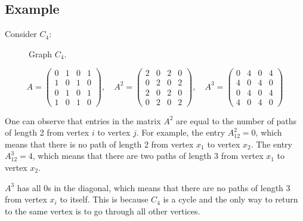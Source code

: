\documentclass[11pt]{article}
\begin{document}
\subsection*{Example}
Consider $C_4$:
\begin{figure}[H]
    \centering
    \hspace{1cm}
    \caption{Graph $C_4$.}
    \label{fig:C4}
\end{figure}
\[
A = \begin{pmatrix}
    0 & 1 & 0 & 1 \\
    1 & 0 & 1 & 0 \\
    0 & 1 & 0 & 1 \\
    1 & 0 & 1 & 0
\end{pmatrix}, \quad
A^2 = \begin{pmatrix}
    2 & 0 & 2 & 0 \\
    0 & 2 & 0 & 2 \\
    2 & 0 & 2 & 0 \\
    0 & 2 & 0 & 2
\end{pmatrix}, \quad A^3 = \begin{pmatrix}
    0 & 4 & 0 & 4 \\
    4 & 0 & 4 & 0 \\
    0 & 4 & 0 & 4 \\
    4 & 0 & 4 & 0
\end{pmatrix}
\]

One can observe that entries in the matrix $A^2$ are equal to the number of paths of length 2 from vertex $i$ to vertex $j$. For example, the entry $A^2_{12} = 0$, which means that there is no path of length 2 from vertex $x_1$ to vertex $x_2$. The entry $A^3_{12} = 4$, which means that there are two paths of length 3 from vertex $x_1$ to vertex $x_2$.

$A^3$ has all 0s in the diagonal, which means that there are no paths of length 3 from vertex $x_i$ to itself. This is because $C_4$ is a cycle and the only way to return to the same vertex is to go through all other vertices.
\end{document}
